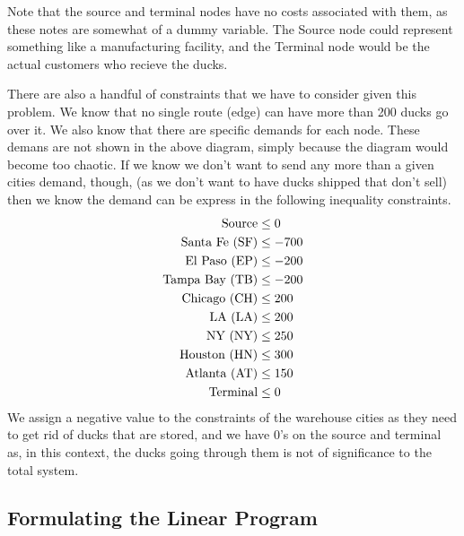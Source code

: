 \documentclass[11pt]{article}
\begin{document}
    Note that the source and terminal nodes have no costs associated with them,
    as these notes are somewhat of a dummy variable. The Source node could
    represent something like a manufacturing facility, and the Terminal node
    would be the actual customers who recieve the ducks.

    There are also a handful of constraints that we have to consider given this
    problem. We know that no single route (edge) can have more than 200 ducks go over
    it. We also know that there are specific demands for each node. These
    demans are not shown in the above diagram, simply because the diagram would
    become too chaotic. If we know we don't want to send any more than a given
    cities demand, though, (as we don't want to have ducks shipped that don't
    sell) then we know the demand can be express in the following inequality
    constraints.
        \begin{align*}
            \centering
            \text{Source}           &\leq 0    \\  
            \text{Santa Fe  (SF)}   &\leq -700 \\
            \text{El Paso   (EP)}   &\leq -200 \\
            \text{Tampa Bay (TB)}   &\leq -200 \\
            \text{Chicago   (CH)}   &\leq 200 \\
            \text{LA        (LA)}   &\leq 200 \\
            \text{NY        (NY)}   &\leq 250 \\
            \text{Houston   (HN)}   &\leq 300 \\
            \text{Atlanta   (AT)}   &\leq 150 \\
            \text{Terminal}         &\leq 0   
        \end{align*}
   We assign a negative value to the constraints of the warehouse cities as
   they need to get rid of ducks that are stored, and we have 0's on the source
   and terminal as, in this context, the ducks going through them is not of
   significance to the total system.

   \subsection{Formulating the Linear Program}
   
\end{document}
